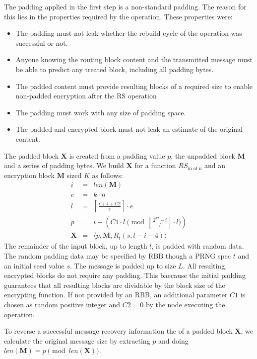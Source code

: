 \documentclass[acmsmall, screen]{acmart}
\begin{document}
The padding applied in the first step is a non-standard padding. The reason for this lies in the properties required by the operation. These properties were:
\begin{itemize}
	\item The padding must not leak whether the rebuild cycle of the operation was successful or not.
	\item Anyone knowing the routing block content and the transmitted message must be able to predict any treated block, including all padding bytes.
	\item The padded content must provide resulting blocks of a required size to enable non-padded encryption after the RS operation
	\item The padding must work with any size of padding space.
	\item The padded and encrypted block must not leak an estimate of the original content.
\end{itemize}

The padded block $\mathbf{X}$ is created from a padding value $p$, the unpadded block $\mathbf{M}$ and a series of padding bytes. We build $\mathbf{X}$ for a function $RS_{\text{m of n}}$ and an encryption block $\mathbf{M}$ sized $K$ as follows:
\begin{eqnarray}
i          & = & len(\mathbf{M})\\
e          & = & k \cdot n\\
l          & = & \left\lceil\frac{i + 4 + C2 }{e}\right\rceil\cdot e\\
p          & = & i + \left( C1 \cdot l \pmod{\left\lfloor\frac{2^{32}-i}{l}\right\rfloor\cdot l}\right)\\
\mathbf{X} & = & \langle p,\mathbf{M},R_{t}\left(s,l-i-4\right)\rangle
\end{eqnarray}    
The remainder of the input block, up to length $l$, is padded with random data. The random padding data may be specified by RBB though a PRNG spec $t$ and an initial seed value $s$. The message is padded up to size $L$. All resulting, encrypted blocks do not require any padding. This baecause the initial padding guarantees that all resulting blocks are dividable by the block size of the encrypting function. If not provided by an RBB, an additional parameter $C1$ is chosen as random positive integer and $C2=0$  by the node executing the operation.

To reverse a successful message recovery information the of a padded block $\mathbf{X}$, we calculate the original message size by extracting $p$ and doing $len(\mathbf{M})=p \pmod{ len(\mathbf{X})}$.
\end{document}
